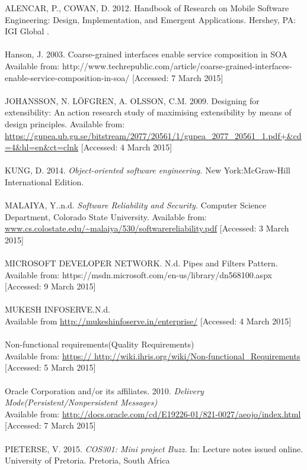 \documentclass[a4paper]{article}
\begin{document}
ALENCAR, P., COWAN, D. 2012. Handbook of Research on Mobile Software Engineering: Design, Implementation, and Emergent Applications. Hershey, PA: IGI Global .
\\
\\Hanson, J. 2003. Coarse-grained interfaces enable service composition in SOA
\\Available from: http://www.techrepublic.com/article/coarse-grained-interfaces-enable-service-composition-in-soa/
[Accessed: 7 March 2015]
\\
\\JOHANSSON, N. LÖFGREN, A. OLSSON, C.M. 2009. Designing for extensibility: An action research study of maximising extensibility by means of design principles.
Available from: \url{https://gupea.ub.gu.se/bitstream/2077/20561/1/gupea_2077_20561_1.pdf+&cd=4&hl=en&ct=clnk}
[Accessed: 4 March 2015]
\\
\\KUNG, D. 2014. \textit{Object-oriented software engineering.} New York:McGraw-Hill International Edition.
\\
\\MALAIYA, Y..n.d. \textit{Software Reliability and Security.} Computer Science Department, Colorado State University. 
Available from: \url{www.cs.colostate.edu/~malaiya/530/softwarereliability​.pdf}
[Accessed: 3 March 2015]
\\
\\ MICROSOFT DEVELOPER NETWORK. N.d. Pipes and Filters Pattern.
Available from: https://msdn.microsoft.com/en-us/library/dn568100.aspx
[Accessed: 9 March 2015]
\\
\\MUKESH INFOSERVE.N.d.
\\Available from \url{http://mukeshinfoserve.in/enterprise/}
[Accessed: 4 March 2015]
\\
\\Non-functional requirements(Quality Requirements)
\\Available from:  \url{https:// http://wiki.ihris.org/wiki/Non-functional_Requirements}
[Accessed: 5 March 2015]
\\
\\Oracle Corporation and/or its affiliates. 2010. \textit{Delivery Mode(Persistent/Nonpersistent Messages)}
\\Available from:  \url{http://docs.oracle.com/cd/E19226-01/821-0027/aeojo/index.html}
[Accessed: 7 March 2015]
\\
\\PIETERSE, V. 2015.\textit{ COS301: Mini project Buzz.} In: Lecture notes issued online. University of Pretoria. Pretoria, South Africa
\end{document}

